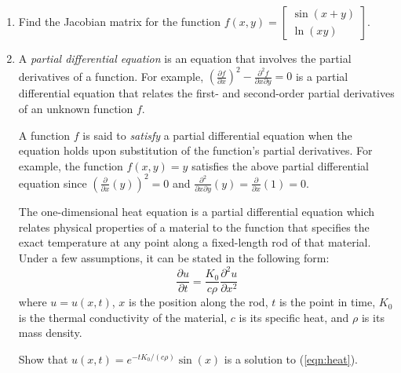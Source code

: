\documentclass{article}
\begin{document}
\begin{enumerate}
\item

Find the Jacobian matrix for the function
$f(x,y) = \begin{bmatrix} \sin(x+y) \\ \ln(xy) \end{bmatrix}$.

\item
{}

A \emph{partial differential equation} is an equation that involves
the partial derivatives of a function.  For example, 
$(\frac{\partial f}{\partial x})^2 - \frac{\partial^2 f}{\partial x 
\partial y} = 0$ is a partial differential equation that relates
the first- and second-order partial derivatives of an unknown function 
$f$.

A function $f$ is said to \emph{satisfy} a partial differential
equation when the equation holds upon substitution of the function's
partial derivatives.  For example, the function $f(x, y) = y$ 
satisfies the above partial differential equation since
$(\frac{\partial}{\partial x}(y))^2 = 0$ and $\frac{\partial^2}{\partial x \partial y}(y) = \frac{\partial}{\partial x}(1) = 0$.

The one-dimensional heat equation is a partial differential equation
which relates physical properties of a material to the function that
specifies the exact temperature at any point along a fixed-length rod
of that material.  Under a few assumptions, it can be stated in the
following form:
\begin{equation}
\frac{\partial u}{\partial t} = \frac{K_0}{c\rho} \frac{\partial^2 u}{\partial x^2} \label{eqn:heat}
\end{equation}
where $u = u(x,t)$, $x$ is the position along the rod, $t$ is the point in time, 
$K_0$ is the thermal conductivity of the material, $c$ is its specific heat, 
and $\rho$ is its mass density.

Show that $u(x,t) = e^{-tK_0/(c\rho)}\sin(x)$ is a solution to (\ref{eqn:heat}).

\end{enumerate}


\newpage
\end{document}
